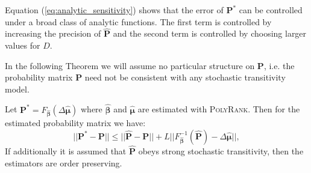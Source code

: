 \documentclass[twoside,11pt]{article}
\begin{document}
Equation (\ref{eq:analytic_sensitivity}) shows that the error of $\boldsymbol{P}^*$ can be controlled under a broad class of analytic functions. The first term is controlled by increasing the precision of $\boldsymbol{\hat P}$ and the second term is controlled by choosing larger values for $D$. 


In the following Theorem we will assume no particular structure on $\boldsymbol{P}$, i.e. the probability matrix $\boldsymbol{P}$ need not be consistent with any stochastic transitivity model. %

\begin{theorem}%
\label{the:agnostic_sensitivity}
Let $\boldsymbol{P^*} = F_{\boldsymbol{\hat{\beta}}}\left(\Delta \boldsymbol{\hat{\mu}}\right)$ where $\boldsymbol{\hat{\beta}}$ and $\boldsymbol{\hat{\mu}}$ are  estimated with \textsc{PolyRank}. Then for the estimated probability matrix we have:
\begin{equation}
\label{eq:agnostic_sensitivity}
||\boldsymbol{P}^* - \boldsymbol{P}|| \leq ||\boldsymbol{\hat P} -\boldsymbol{P}|| + L ||F^{-1}_{\boldsymbol{\hat \beta}}(\boldsymbol{\hat{P}}) - \Delta\boldsymbol{\hat \mu}||,
\end{equation}
If additionally it is assumed that $\boldsymbol{\hat P}$ obeys strong stochastic transitivity, then the estimators are order preserving.
\end{theorem}
\end{document}
